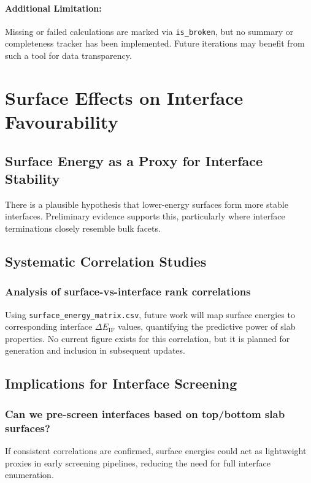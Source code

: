 
\paragraph{Additional Limitation:}
Missing or failed calculations are marked via \texttt{is\_broken}, but no summary or completeness tracker has been
implemented. Future iterations may benefit from such a tool for data transparency.

\section{Surface Effects on Interface Favourability}
\label{section:surface_effects}

\subsection{Surface Energy as a Proxy for Interface Stability}
There is a plausible hypothesis that lower-energy surfaces form more stable interfaces. Preliminary evidence supports
this, particularly where interface terminations closely resemble bulk facets.

\subsection{Systematic Correlation Studies}

\subsubsection{Analysis of surface-vs-interface rank correlations}
Using \texttt{surface\_energy\_matrix.csv}, future work will map surface energies to corresponding interface
$\Delta E_\mathrm{IF}$ values, quantifying the predictive power of slab properties. No current figure exists for this
correlation, but it is planned for generation and inclusion in subsequent updates.


\subsection{Implications for Interface Screening}

\subsubsection{Can we pre-screen interfaces based on top/bottom slab surfaces?}
If consistent correlations are confirmed, surface energies could act as lightweight proxies in early screening
pipelines, reducing the need for full interface enumeration.

